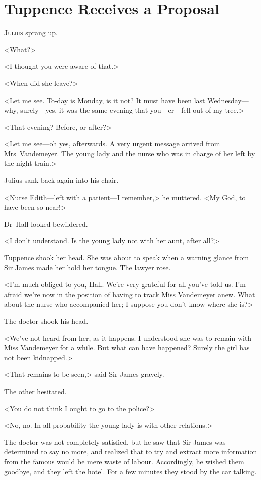 \chapter{Tuppence Receives a Proposal} 

 \lettrine{J}{ulius} sprang up.

\zz
<What?>

\zz
<I thought you were aware of that.>

\zz
<When did she leave?>

<Let me see. To-day is Monday, is it not? It must have been last Wednesday—why, surely—yes, it was the same evening that you—er—fell out of my tree.>

<That evening? Before, or after?>

<Let me see—oh yes, afterwards. A very urgent message arrived from Mrs~Vandemeyer. The young lady and the nurse who was in charge of her left by the night train.>

Julius sank back again into his chair.

<Nurse Edith—left with a patient—I remember,> he muttered. <My God, to have been so near!>

Dr~Hall looked bewildered.

<I don't understand. Is the young lady not with her aunt, after all?>

Tuppence shook her head. She was about to speak when a warning glance from Sir James made her hold her tongue. The lawyer rose.

<I'm much obliged to you, Hall. We're very grateful for all you've told us. I'm afraid we're now in the position of having to track Miss Vandemeyer anew. What about the nurse who accompanied her; I suppose you don't know where she is?>

The doctor shook his head.

<We've not heard from her, as it happens. I understood she was to remain with Miss Vandemeyer for a while. But what can have happened? Surely the girl has not been kidnapped.>

<That remains to be seen,> said Sir James gravely.

The other hesitated.

<You do not think I ought to go to the police?>

<No, no. In all probability the young lady is with other relations.>

The doctor was not completely satisfied, but he saw that Sir James was determined to say no more, and realized that to try and extract more information from the famous  would be mere waste of labour. Accordingly, he wished them goodbye, and they left the hotel. For a few minutes they stood by the car talking.

